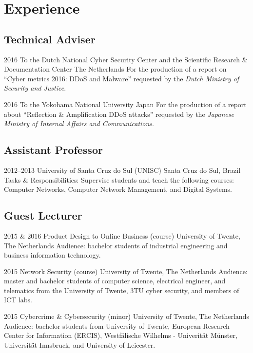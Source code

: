 \documentclass[print]{friggeri-cv} %
\begin{document}
\vspace{-0.7cm}
\section{Experience}

\subsection{Technical Adviser}
\begin{entrylist}
\entry
{2016}
{To the Dutch National Cyber Security Center and the Scientific Research \& Documentation Center}
{The Netherlands}
{For the production of a report on ``Cyber metrics 2016: DDoS and Malware'' requested by the \emph{Dutch Ministry of Security and Justice}.}

\entry
{2016}
{To the Yokohama National University}
{Japan}
{For the production of a report about ``Reflection \& Amplification DDoS attacks'' requested by the \emph{Japanese Ministry of Internal Affairs and Communications}.}
\end{entrylist}

\subsection{Assistant Professor}
\begin{entrylist}
\entry
{2012--2013}
{University of Santa Cruz do Sul (UNISC)}
{Santa Cruz do Sul, Brazil}
{Tasks \& Responsibilities: Supervise students and teach the following courses: Computer Networks, Computer Network Management, and Digital Systems.}
\end{entrylist}

\subsection{Guest Lecturer}
\begin{entrylist}
\entry
{2015 \& 2016}
{Product Design to Online Business (course)}
{University of Twente, The Netherlands}
{Audience: bachelor students of industrial engineering and business information technology.}

\entry
{2015}
{Network Security (course)}
{University of Twente, The Netherlands}
{Audience: master and bachelor students of computer science, electrical engineer, and telematics from the University of Twente, 3TU cyber security, and members of ICT labs. }

\entry
{2015}
{Cybercrime \& Cybersecurity (minor)}
{University of Twente, The Netherlands}
{Audience: bachelor students from University of Twente, European Research Center for Information (ERCIS), Westfälische Wilhelms - Univerität Münster, Universität Innsbruck, and University of Leicester. }
\end{entrylist}
\end{document}
